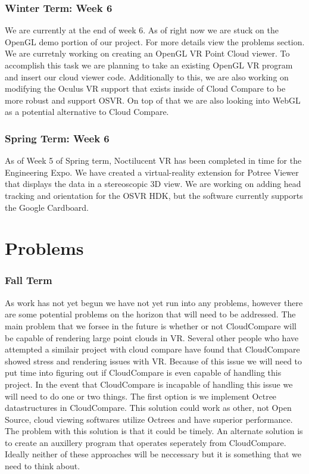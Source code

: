 \documentclass[draftclsnofoot,onecolumn]{IEEEtran}
\begin{document}
\subsubsection{Winter Term: Week 6}

We are currently at the end of week 6. 
As of right now we are stuck on the OpenGL demo portion of our project.
For more details view the problems section.
We are curretnly working on creating an OpenGL VR Point Cloud viewer.
To accomplish this task we are planning to take an existing OpenGL VR program and insert our cloud viewer code.
Additionally to this, we are also working on modifying the Oculus VR support that exists inside of Cloud Compare to be more robust and support OSVR.
On top of that we are also looking into WebGL as a potential alternative to Cloud Compare.

\subsubsection{Spring Term: Week 6}

As of Week 5 of Spring term, Noctilucent VR has been completed in time for the Engineering Expo. 
We have created a virtual-reality extension for Potree Viewer that displays the data in a stereoscopic 3D view. 
We are working on adding head tracking and orientation for the OSVR HDK, but the software currently supports the Google Cardboard. 

\section{Problems}

\subsubsection{Fall Term}

As work has not yet begun we have not yet run into any problems, however there are some potential problems on the horizon that will need to be addressed.
The main problem that we forsee in the future is whether or not CloudCompare will be capable of rendering large point clouds in VR.
Several other people who have attempted a similair project with cloud compare have found that CloudCompare showed stress and rendering issues with VR.
Because of this issue we will need to put time into figuring out if CloudCompare is even capable of handling this project.
In the event that CloudCompare is incapable of handling this issue we will need to do one or two things.
The first option is we implement Octree datastructures in CloudCompare.
This solution could work as other, not Open Source, cloud viewing softwares utilize Octrees and have superior performance.
The problem with this solution is that it could be timely.
An alternate solution is to create an auxillery program that operates seperately from CloudCompare.
Ideally neither of these approaches will be neccessary but it is something that we need to think about.
\end{document}
